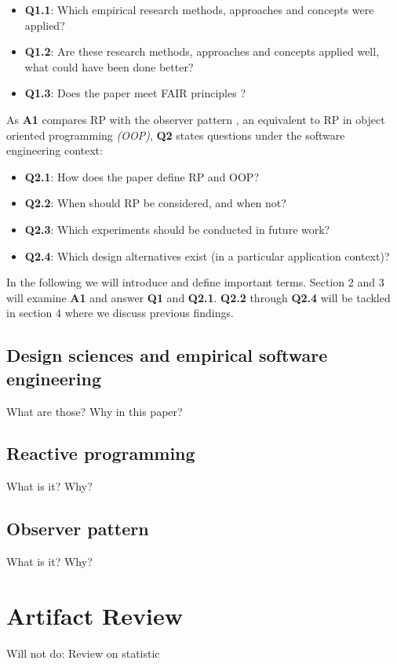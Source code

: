 \documentclass[11pt,a4paper,twocolumn]{article}
\begin{document}
	\begin{itemize}
		\item \textbf{Q1.1}: Which empirical research methods, approaches and concepts were applied?
		\item \textbf{Q1.2}: Are these research methods, approaches and concepts applied well, what could have been done better?
		\item \textbf{Q1.3}: Does the paper meet FAIR principles \cite{2019arXiv190805986H} \cite{wilkinson:2016}?
	\end{itemize}

	As \textbf{A1} compares RP with the observer pattern \cite{gamma1995design}, an equivalent to RP in object oriented programming \emph{(OOP)}, \textbf{Q2} states questions under the software engineering context:

	\begin{itemize}
		\item \textbf{Q2.1}: How does the paper define RP and OOP?
		\item \textbf{Q2.2}: When should RP be considered, and when not?
		\item \textbf{Q2.3}: Which experiments should be conducted in future work?
		\item \textbf{Q2.4}: Which design alternatives exist (in a particular application context)?
	\end{itemize}

	In the following we will introduce and define important terms. Section 2 and 3 will examine \textbf{A1} and answer \textbf{Q1} and \textbf{Q2.1}. \textbf{Q2.2} through \textbf{Q2.4} will be tackled in section 4 where we discuss previous findings.

	\subsection{Design sciences and empirical software engineering}
	What are those? Why in this paper?

	\subsection{Reactive programming}
	What is it? Why?

	\subsection{Observer pattern}
	What is it? Why?

	\section{Artifact Review}
	Will not do: Review on statistic
\end{document}
